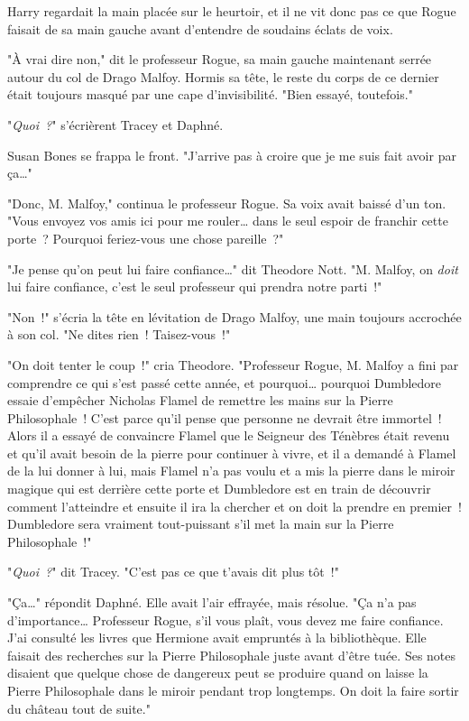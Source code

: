 Harry regardait la main placée sur le heurtoir, et il ne vit donc pas ce que Rogue faisait de sa main gauche avant d'entendre de soudains éclats de voix.

"À vrai dire non," dit le professeur Rogue, sa main gauche maintenant serrée autour du col de Drago Malfoy. Hormis sa tête, le reste du corps de ce dernier était toujours masqué par une cape d'invisibilité. "Bien essayé, toutefois."

"\emph{Quoi~?}" s'écrièrent Tracey et Daphné.

Susan Bones se frappa le front. "J'arrive pas à croire que je me suis fait avoir par ça…"

"Donc, M. Malfoy," continua le professeur Rogue. Sa voix avait baissé d'un ton. "Vous envoyez vos amis ici pour me rouler… dans le seul espoir de franchir cette porte~? Pourquoi feriez-vous une chose pareille~?"

"Je pense qu'on peut lui faire confiance…" dit Theodore Nott. "M. Malfoy, on \emph{doit} lui faire confiance, c'est le seul professeur qui prendra notre parti~!"

"Non~!" s'écria la tête en lévitation de Drago Malfoy, une main toujours accrochée à son col. "Ne dites rien~! Taisez-vous~!"

"On doit tenter le coup~!" cria Theodore. "Professeur Rogue, M. Malfoy a fini par comprendre ce qui s'est passé cette année, et pourquoi… pourquoi Dumbledore essaie d'empêcher Nicholas Flamel de remettre les mains sur la Pierre Philosophale~! C'est parce qu'il pense que personne ne devrait être immortel~! Alors il a essayé de convaincre Flamel que le Seigneur des Ténèbres était revenu et qu'il avait besoin de la pierre pour continuer à vivre, et il a demandé à Flamel de la lui donner à lui, mais Flamel n'a pas voulu et a mis la pierre dans le miroir magique qui est derrière cette porte et Dumbledore est en train de découvrir comment l'atteindre et ensuite il ira la chercher et on doit la prendre en premier~! Dumbledore sera vraiment tout-puissant s'il met la main sur la Pierre Philosophale~!"

"\emph{Quoi~?}" dit Tracey. "C'est pas ce que t'avais dit plus tôt~!"

"Ça…" répondit Daphné. Elle avait l'air effrayée, mais résolue. "Ça n'a pas d'importance… Professeur Rogue, s'il vous plaît, vous devez me faire confiance. J'ai consulté les livres que Hermione avait empruntés à la bibliothèque. Elle faisait des recherches sur la Pierre Philosophale juste avant d'être tuée. Ses notes disaient que quelque chose de dangereux peut se produire quand on laisse la Pierre Philosophale dans le miroir pendant trop longtemps. On doit la faire sortir du château tout de suite."


